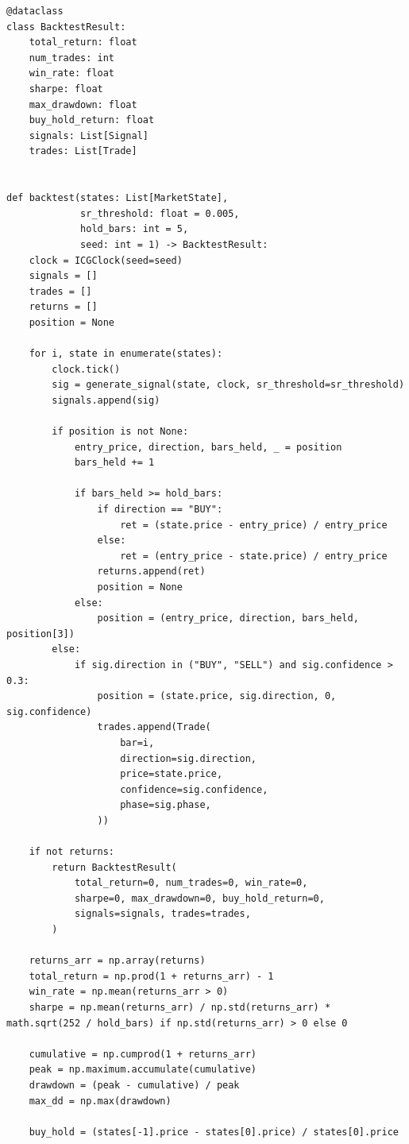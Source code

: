 \begin{verbatim}
@dataclass
class BacktestResult:
    total_return: float
    num_trades: int
    win_rate: float
    sharpe: float
    max_drawdown: float
    buy_hold_return: float
    signals: List[Signal]
    trades: List[Trade]


def backtest(states: List[MarketState],
             sr_threshold: float = 0.005,
             hold_bars: int = 5,
             seed: int = 1) -> BacktestResult:
    clock = ICGClock(seed=seed)
    signals = []
    trades = []
    returns = []
    position = None 

    for i, state in enumerate(states):
        clock.tick()
        sig = generate_signal(state, clock, sr_threshold=sr_threshold)
        signals.append(sig)

        if position is not None:
            entry_price, direction, bars_held, _ = position
            bars_held += 1

            if bars_held >= hold_bars:
                if direction == "BUY":
                    ret = (state.price - entry_price) / entry_price
                else:
                    ret = (entry_price - state.price) / entry_price
                returns.append(ret)
                position = None
            else:
                position = (entry_price, direction, bars_held, position[3])
        else:
            if sig.direction in ("BUY", "SELL") and sig.confidence > 0.3:
                position = (state.price, sig.direction, 0, sig.confidence)
                trades.append(Trade(
                    bar=i,
                    direction=sig.direction,
                    price=state.price,
                    confidence=sig.confidence,
                    phase=sig.phase,
                ))

    if not returns:
        return BacktestResult(
            total_return=0, num_trades=0, win_rate=0,
            sharpe=0, max_drawdown=0, buy_hold_return=0,
            signals=signals, trades=trades,
        )

    returns_arr = np.array(returns)
    total_return = np.prod(1 + returns_arr) - 1
    win_rate = np.mean(returns_arr > 0)
    sharpe = np.mean(returns_arr) / np.std(returns_arr) * math.sqrt(252 / hold_bars) if np.std(returns_arr) > 0 else 0

    cumulative = np.cumprod(1 + returns_arr)
    peak = np.maximum.accumulate(cumulative)
    drawdown = (peak - cumulative) / peak
    max_dd = np.max(drawdown)

    buy_hold = (states[-1].price - states[0].price) / states[0].price


\end{verbatim}
